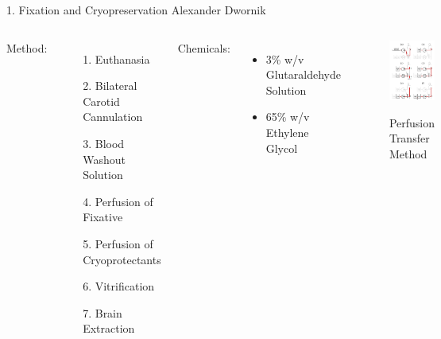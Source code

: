 \documentclass[10pt]{beamer}
\begin{document}
\begin{frame}{1. Fixation and Cryopreservation\hspace{0pt plus 1 filll} \small{Alexander Dwornik}}

\begin{columns}[T,onlytextwidth]
		\vspace{0.2cm}
		Method: \cite{McIntyre2015448}
\begin{itemize}
	\item [1.] Euthanasia
	\item [2.] Bilateral Carotid Cannulation
	\item [3.] Blood Washout Solution
	\item [4.] Perfusion of Fixative 
	\item [5.] Perfusion of Cryoprotectants
	\item [6.] Vitrification
	\item [7.] Brain Extraction
\end{itemize}	
Chemicals:
\begin{itemize}[label={$\bullet$}]
	\item 3\% w/v Glutaraldehyde Solution 
	\item 65\% w/v Ethylene Glycol 
\end{itemize}
		\begin{figure}
			\centering
			\includegraphics[totalheight=5cm,width=.3\paperwidth]{bunny_perfusion_diagram.png}
			\caption \small  Perfusion Transfer Method \cite{McIntyre2015448}
		\end{figure}
	\end{columns}
	
\end{frame}
\end{document}
